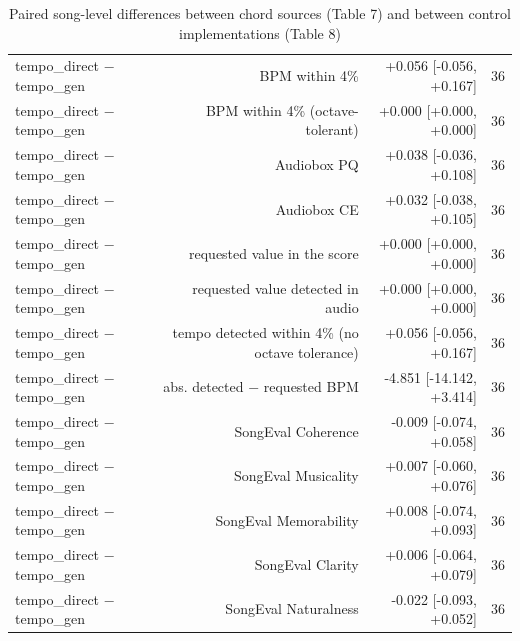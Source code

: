 \begin{table}[t]
\begin{tabular}{lrrr}
tempo\_direct $-$ tempo\_gen & BPM within 4\% & +0.056 [-0.056, +0.167] & 36 \\
tempo\_direct $-$ tempo\_gen & BPM within 4\% (octave-tolerant) & +0.000 [+0.000, +0.000] & 36 \\
tempo\_direct $-$ tempo\_gen & Audiobox PQ & +0.038 [-0.036, +0.108] & 36 \\
tempo\_direct $-$ tempo\_gen & Audiobox CE & +0.032 [-0.038, +0.105] & 36 \\
tempo\_direct $-$ tempo\_gen & requested value in the score & +0.000 [+0.000, +0.000] & 36 \\
tempo\_direct $-$ tempo\_gen & requested value detected in audio & +0.000 [+0.000, +0.000] & 36 \\
tempo\_direct $-$ tempo\_gen & tempo detected within 4\% (no octave tolerance) & +0.056 [-0.056, +0.167] & 36 \\
tempo\_direct $-$ tempo\_gen & abs. detected $-$ requested BPM & -4.851 [-14.142, +3.414] & 36 \\
tempo\_direct $-$ tempo\_gen & SongEval Coherence & -0.009 [-0.074, +0.058] & 36 \\
tempo\_direct $-$ tempo\_gen & SongEval Musicality & +0.007 [-0.060, +0.076] & 36 \\
tempo\_direct $-$ tempo\_gen & SongEval Memorability & +0.008 [-0.074, +0.093] & 36 \\
tempo\_direct $-$ tempo\_gen & SongEval Clarity & +0.006 [-0.064, +0.079] & 36 \\
tempo\_direct $-$ tempo\_gen & SongEval Naturalness & -0.022 [-0.093, +0.052] & 36 \\
\bottomrule
\end{tabular}
\caption{Paired song-level differences between chord sources (Table 7) and between control implementations (Table 8)}
\label{tab:backing_paired}
\end{table}
